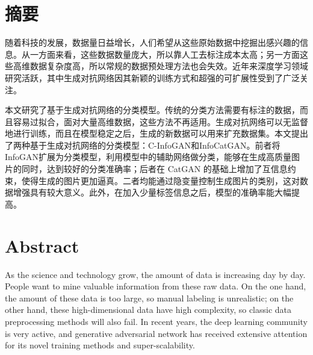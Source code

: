 \maketitle%
\MAKETITLE%
\makedeclaration%
\intobmk\chapter*{摘\quad 要}%
\setcounter{page}{1}%

随着科技的发展，数据量日益增长，人们希望从这些原始数据中挖掘出感兴趣的信息。从一方面来看，这些数据数量庞大，所以靠人工去标注成本太高；另一方面这些高维数据复杂度高，所以常规的数据预处理方法也会失效。近年来深度学习领域研究活跃，其中生成对抗网络因其新颖的训练方式和超强的可扩展性受到了广泛关注。

本文研究了基于生成对抗网络的分类模型。传统的分类方法需要有标注的数据，而且容易过拟合，面对大量高维数据，这些方法不再适用。生成对抗网络可以无监督地进行训练，而且在模型稳定之后，生成的新数据可以用来扩充数据集。本文提出了两种基于生成对抗网络的分类模型：C-InfoGAN和InfoCatGAN。前者将InfoGAN扩展为分类模型，利用模型中的辅助网络做分类，能够在生成高质量图片的同时，达到较好的分类准确率；后者在 CatGAN 的基础上增加了互信息约束，使得生成的图片更加逼真。二者均能通过隐变量控制生成图片的类别，这对数据增强具有较大意义。此外，在加入少量标签信息之后，模型的准确率能大幅提高。

\intobmk\chapter*{Abstract}%

As the science and technology grow, the amount of data is increasing day by day. People want to mine valuable information from these raw data. On the one hand, the amount of these data is too large, so manual labeling is unrealistic; on the other hand, these high-dimensional data have high complexity, so classic data preprocessing methods will also fail. In recent years, the deep learning community is very active, and generative adversarial network has received extensive attention for its novel training methods and super-scalability.

